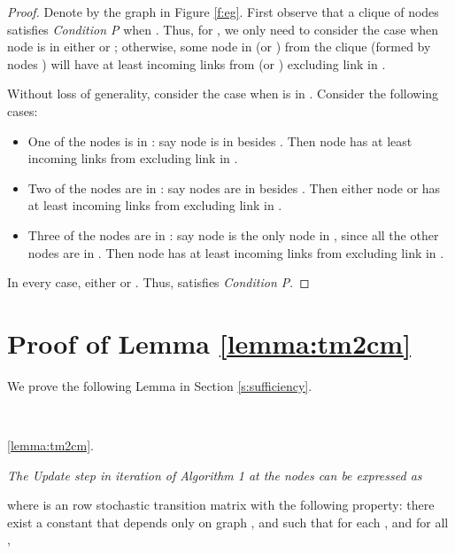\documentclass{llncs}
\newcommand{\fillbox}{\hspace*{\fill}}
\begin{document}
\begin{proof}
Denote by  the graph in Figure \ref{f:eg}. First observe that a clique of  nodes satisfies {\em Condition P} when . Thus, for , we only need to consider the case when node  is in either  or ; otherwise, some node in  (or ) from the clique (formed by nodes ) will have at least  incoming links from  (or ) excluding link in . 

Without loss of generality, consider the case when  is in . Consider the following cases:

\begin{itemize}
\item One of the nodes  is in : say node  is in  besides . Then node  has at least  incoming links from  excluding link in .

\item Two of the nodes  are in : say nodes  are in  besides . Then either node  or  has at least  incoming links from  excluding link in .

\item Three of the nodes  are in : say node  is the only node in , since all the other nodes are in . Then node  has at least  incoming links from  excluding link in .

\end{itemize}
In every case, either  or . Thus,  satisfies {\em Condition P}.

\fillbox
\end{proof}


\section{Proof of Lemma \ref{lemma:tm2cm}}
\label{a:tm2cm}

We prove the following Lemma in Section \ref{s:sufficiency}.

~

 \ref{lemma:tm2cm}.
{\em 
The {\em Update} step in iteration  of Algorithm 1 at the nodes can be expressed as 


where {\normalfont} is an  row stochastic transition matrix with the following property: there exist a constant  that depends only on graph , and  such that for each , and  for all , 


}
\end{document}
